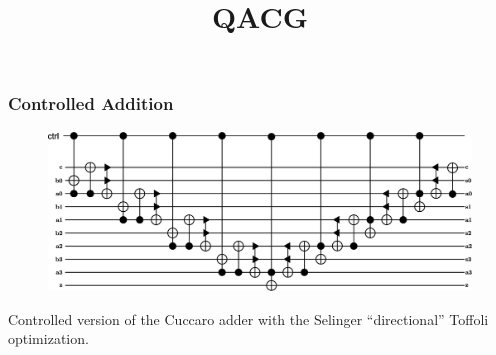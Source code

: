 \documentclass[utf8]{beamer}
\begin{document}
\title{QACG}

\begin{frame}

\titlepage

\end{frame}

\begin{frame}
  \frametitle{Controlled Addition} 
  \begin{figure} 
    \includegraphics[width=\linewidth]{diagrams/4BitRippleAdderCtrl}
  \end{figure}
  Controlled version of the Cuccaro adder with the Selinger ``directional'' Toffoli optimization.
\end{frame}
\end{document}

